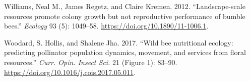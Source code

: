 \documentclass[11pt,]{article}
\begin{document}
\leavevmode\hypertarget{ref-Williams2012b}{}%
Williams, Neal M., James Regetz, and Claire Kremen. 2012.
``Landscape-scale resources promote colony growth but not reproductive
performance of bumble bees.'' \emph{Ecology} 93 (5): 1049--58.
\url{https://doi.org/10.1890/11-1006.1}.

\leavevmode\hypertarget{ref-Woodard2017}{}%
Woodard, S. Hollis, and Shalene Jha. 2017. ``Wild bee nutritional
ecology: predicting pollinator population dynamics, movement, and
services from floral resources.'' \emph{Curr. Opin. Insect Sci.} 21
(Figure 1): 83--90. \url{https://doi.org/10.1016/j.cois.2017.05.011}.
\end{document}
